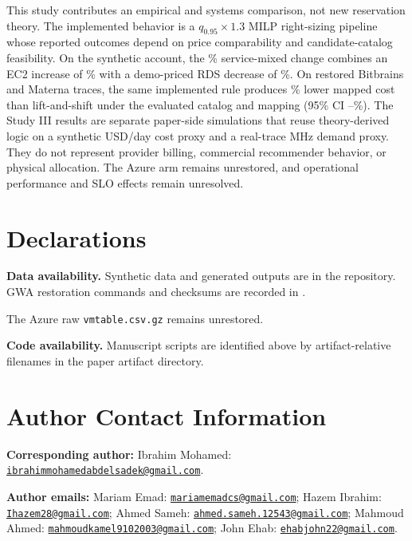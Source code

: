 \documentclass[11pt]{article}
\begin{document}
This study contributes an empirical and systems comparison, not new
reservation theory. The implemented behavior is a
\(q_{0.95}\times1.3\) MILP right-sizing pipeline whose reported outcomes
depend on price comparability and candidate-catalog feasibility. On the
synthetic account, the \evidAggregateDeltaPct\% service-mixed change combines
an EC2 increase of \evidEcTwoDeltaPct\% with a demo-priced RDS decrease of
\evidRdsSavingsPct\%. On restored Bitbrains and Materna traces, the same
implemented rule produces \extOverallSavingsPct\% lower mapped cost than
lift-and-shift under the evaluated catalog and mapping (95\% CI
\extOverallSavingsCiLow--\extOverallSavingsCiHigh\%). The Study III results
are separate paper-side simulations that reuse theory-derived logic on a
synthetic USD/day cost proxy and a real-trace MHz demand proxy. They do not
represent provider billing, commercial recommender behavior, or physical
allocation. The Azure arm remains unrestored, and operational performance and
SLO effects remain unresolved.

\section*{Declarations}

\textbf{Data availability.} Synthetic data and generated outputs are in the
repository. GWA restoration commands and checksums are recorded in
.

The Azure raw \texttt{vmtable.csv.gz} remains unrestored.

\textbf{Code availability.} Manuscript scripts are identified above by
artifact-relative filenames in the paper artifact directory.


\section*{Author Contact Information}
\noindent\textbf{Corresponding author:} Ibrahim Mohamed:
\href{mailto:ibrahimmohamedabdelsadek@gmail.com}{\nolinkurl{ibrahimmohamedabdelsadek@gmail.com}}.

\noindent\textbf{Author emails:} Mariam Emad:
\href{mailto:mariamemadcs@gmail.com}{\nolinkurl{mariamemadcs@gmail.com}}; Hazem Ibrahim:
\href{mailto:Ihazem28@gmail.com}{\nolinkurl{Ihazem28@gmail.com}}; Ahmed Sameh:
\href{mailto:ahmed.sameh.12543@gmail.com}{\nolinkurl{ahmed.sameh.12543@gmail.com}}; Mahmoud Ahmed:
\href{mailto:mahmoudkamel9102003@gmail.com}{\nolinkurl{mahmoudkamel9102003@gmail.com}}; John Ehab:
\href{mailto:ehabjohn22@gmail.com}{\nolinkurl{ehabjohn22@gmail.com}}.



\end{document}
